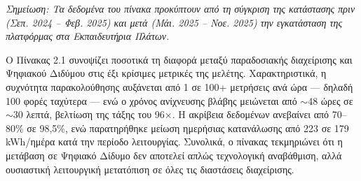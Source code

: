 \noindent\textit{Σημείωση: Τα δεδομένα του πίνακα προκύπτουν από τη σύγκριση της κατάστασης πριν (Σεπ. 2024 -- Φεβ. 2025) και μετά (Μάι. 2025 -- Νοε. 2025) την εγκατάσταση της πλατφόρμας στα Εκπαιδευτήρια Πλάτων.}

Ο Πίνακας 2.1 συνοψίζει ποσοτικά τη διαφορά μεταξύ παραδοσιακής διαχείρισης και Ψηφιακού Διδύμου στις έξι κρίσιμες μετρικές της μελέτης. Χαρακτηριστικά, η συχνότητα παρακολούθησης αυξάνεται από 1 σε 100+ μετρήσεις ανά ώρα --- δηλαδή 100 φορές ταχύτερα --- ενώ ο χρόνος ανίχνευσης βλάβης μειώνεται από $\sim$48 ώρες σε $\sim$30 λεπτά, βελτίωση της τάξης του 96$\times$. Η ακρίβεια δεδομένων ανεβαίνει από 70--80\% σε 98,5\%, ενώ παρατηρήθηκε μείωση ημερήσιας κατανάλωσης από 223 σε 179 \textlatin{kWh/ημέρα} κατά την περίοδο λειτουργίας. Συνολικά, ο πίνακας τεκμηριώνει ότι η μετάβαση σε Ψηφιακό Δίδυμο δεν αποτελεί απλώς τεχνολογική αναβάθμιση, αλλά ουσιαστική λειτουργική μετατόπιση σε όλες τις διαστάσεις διαχείρισης.
